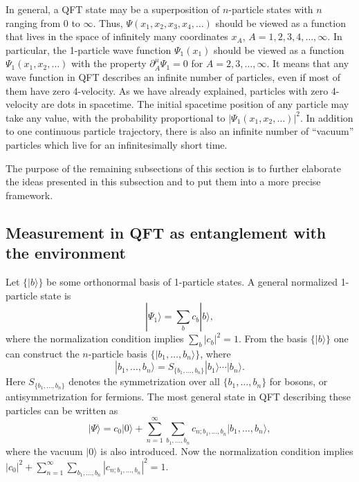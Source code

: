 \documentclass[12pt,twoside]{report} %
\begin{document}
In general, a QFT state may be a superposition of $n$-particle states
with $n$ ranging from $0$ to $\infty$. Thus, $\Psi(x_1,x_2,x_3,x_4, \ldots )$
should be viewed as a function that lives in the space of infinitely many coordinates
$x_A$, $A=1,2,3,4,\ldots, \infty$. In particular, the 1-particle wave function
$\Psi_1(x_1)$ should be viewed as a function $\Psi_1(x_1,x_2, \ldots)$
with the property $\partial^{\mu}_A \Psi_1 =0$ for $A=2,3,\ldots, \infty$.
It means that any wave function in QFT describes an infinite number of particles,
even if most of them have zero 4-velocity. As we have already explained, particles
with zero 4-velocity are dots in spacetime. The initial spacetime position of any particle
may take any value, with the probability proportional to
$|\Psi_1(x_1,x_2, \ldots)|^2$. In addition to one continuous particle trajectory, there is also an infinite
number of ``vacuum'' particles which live for an infinitesimally short time.

The purpose of the remaining subsections of this section is to further elaborate
the ideas presented in this subsection 
and to put them into a more precise framework.


\subsection{Measurement in QFT as entanglement with the environment}
\label{nikolic:SEC3.1}

Let $\{|b\rangle \}$ be some orthonormal basis of 1-particle states.
A general normalized 1-particle state is
\begin{equation}\label{nikolic:e3.1}
 |\Psi_1\rangle = \sum_b c_b |b\rangle ,
\end{equation}
where the normalization condition implies $ \sum_b |c_b|^2=1$. 
From the basis $\{|b\rangle \}$ one can construct the $n$-particle basis
$\{|b_1,\ldots, b_n\rangle \}$, where
\begin{equation}\label{nikolic:e3.2}
|b_1,\ldots, b_n\rangle = S_{\{b_1,\ldots, b_n\}}|b_1\rangle \cdots  |b_n\rangle .
\end{equation}
Here $S_{\{b_1,\ldots, b_n\}}$ denotes the symmetrization over all $\{b_1,\ldots, b_n\}$
for bosons, or antisymmetrization for fermions. The most general state in QFT
describing these particles can be written as
\begin{equation}\label{nikolic:e3.3}
 |\Psi\rangle = c_0 |0\rangle +
\sum_{n=1}^{\infty} \sum_{b_1,\ldots, b_n} c_{n;b_1,\ldots,b_n} 
|b_1,\ldots, b_n\rangle ,
\end{equation}
where the vacuum $|0\rangle$ is also introduced. 
Now the normalization condition implies
$|c_0|^2+\sum_{n=1}^{\infty} \sum_{b_1,\ldots, b_n} |c_{n;b_1,\ldots,b_n}|^2 =1$.
\end{document}
